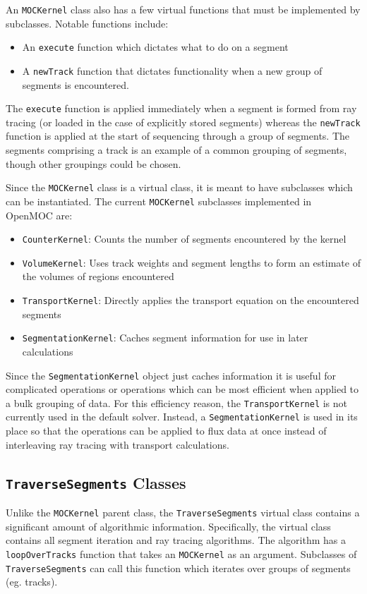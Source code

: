 An \texttt{MOCKernel} class also has a few virtual functions that must be implemented by subclasses. Notable functions include:
\begin{itemize}
	\item An \texttt{execute} function which dictates what to do on a segment
	\item A \texttt{newTrack} function that dictates functionality when a new group of segments is encountered.
\end{itemize}
The \texttt{execute} function is applied immediately when a segment is formed from ray tracing (or loaded in the case of explicitly stored segments) whereas the \texttt{newTrack} function is applied at the start of sequencing through a group of segments. The segments comprising a track is an example of a common grouping of segments, though other groupings could be chosen.

Since the \texttt{MOCKernel} class is a virtual class, it is meant to have subclasses which can be instantiated. The current \texttt{MOCKernel} subclasses implemented in OpenMOC are:
\begin{itemize}
	\item \texttt{CounterKernel}: Counts the number of segments encountered by the kernel
	\item \texttt{VolumeKernel}: Uses track weights and segment lengths to form an estimate of the volumes of regions encountered
	\item \texttt{TransportKernel}: Directly applies the transport equation on the encountered segments
	\item \texttt{SegmentationKernel}: Caches segment information for use in later calculations
\end{itemize}
Since the \texttt{SegmentationKernel} object just caches information it is useful for complicated operations or operations which can be most efficient when applied to a bulk grouping of data. For this efficiency reason, the \texttt{TransportKernel} is not currently used in the default solver. Instead, a \texttt{SegmentationKernel} is used in its place so that the operations can be applied to flux data at once instead of interleaving ray tracing with transport calculations.

\subsection{\texttt{TraverseSegments} Classes}

Unlike the \texttt{MOCKernel} parent class, the \texttt{TraverseSegments} virtual class contains a significant amount of algorithmic information. Specifically, the virtual class contains all segment iteration and ray tracing algorithms. The algorithm has a \texttt{loopOverTracks} function that takes an \texttt{MOCKernel} as an argument. Subclasses of \texttt{TraverseSegments} can call this function which iterates over groups of segments (eg. tracks). 

